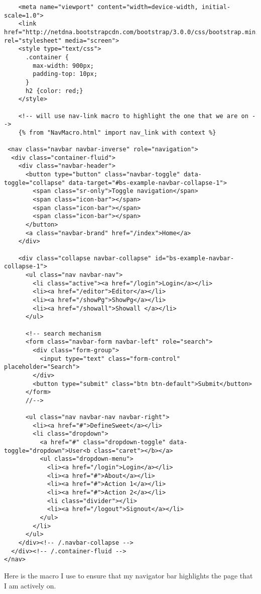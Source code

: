 \documentclass[11pt]{article}
\begin{document}
\begin{verbatim}
    <meta name="viewport" content="width=device-width, initial-scale=1.0">
    <link href="http://netdna.bootstrapcdn.com/bootstrap/3.0.0/css/bootstrap.min.css" rel="stylesheet" media="screen">
    <style type="text/css">
      .container {
        max-width: 900px;
        padding-top: 10px;
      }
      h2 {color: red;}
    </style>

    <!-- will use nav-link macro to highlight the one that we are on -->
    {% from "NavMacro.html" import nav_link with context %}

 <nav class="navbar navbar-inverse" role="navigation">
  <div class="container-fluid">
    <div class="navbar-header">
      <button type="button" class="navbar-toggle" data-toggle="collapse" data-target="#bs-example-navbar-collapse-1">
        <span class="sr-only">Toggle navigation</span>
        <span class="icon-bar"></span>
        <span class="icon-bar"></span>
        <span class="icon-bar"></span>
      </button>
      <a class="navbar-brand" href="/index">Home</a>
    </div>

    <div class="collapse navbar-collapse" id="bs-example-navbar-collapse-1">
      <ul class="nav navbar-nav">
        <li class="active"><a href="/login">Login</a></li>
        <li><a href="/editor">Editor</a></li>
        <li><a href="/showPg">ShowPg</a></li>
        <li><a href="/showall">Showall </a></li>
      </ul>

      <!-- search mechanism
      <form class="navbar-form navbar-left" role="search">
        <div class="form-group">
          <input type="text" class="form-control" placeholder="Search">
        </div>
        <button type="submit" class="btn btn-default">Submit</button>
      </form>
      //-->

      <ul class="nav navbar-nav navbar-right">
        <li><a href="#">DefineSweet</a></li>
        <li class="dropdown">
          <a href="#" class="dropdown-toggle" data-toggle="dropdown">User<b class="caret"></b></a>
          <ul class="dropdown-menu">
            <li><a href="/login">Login</a></li>
            <li><a href="#">About</a></li>
            <li><a href="#">Action 1</a></li>
            <li><a href="#">Action 2</a></li>
            <li class="divider"></li>
            <li><a href="/logout">Signout</a></li>
          </ul>
        </li>
      </ul>
    </div><!-- /.navbar-collapse -->
  </div><!-- /.container-fluid -->
</nav>
\end{verbatim}

Here is the macro I use to ensure that my navigator bar highlights the
page that I am actively on.
\end{document}
